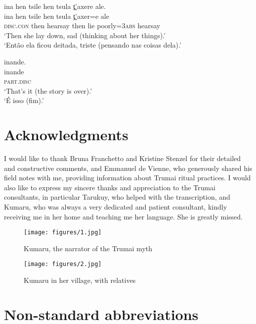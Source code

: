 \documentclass[output=paper,
modfonts,nonflat
]{langsci/langscibook}
\begin{document}
\ea ina hen tsile hen tsula t̪'axere ale.\\[.3em]
\gll ina hen tsile  hen tsula  t̪'axer=e  ale\\
\textsc{disc.con}  then  hearsay  then  lie      poorly=\textsc{3abs}  hearsay\\
\glt `Then she lay down, sad (thinking about her things).'\\
‘Então ela ficou deitada, triste (pensando nas coisas dela).’
\z

\ea inande.\\[.3em]
\gll inande\\
\textsc{part.disc}\\
\glt `That's it (the story is over).'\\
‘É isso (fim).’
\z

\section*{Acknowledgments}
I would like to thank Bruna Franchetto and Kristine Stenzel for their detailed and constructive comments, and Emmanuel de Vienne, who generously shared his field notes with me, providing information about Trumai ritual practices. I would also like to express my sincere thanks and appreciation to the Trumai consultants, in particular Tarukuy, who helped with the transcription, and Kumaru, who was always a very dedicated and patient consultant, kindly receiving me in her home and teaching me her language. She is greatly missed. 



\begin{figure}
  \texttt{[image: figures/1.jpg]}
  \caption{Kumaru, the narrator of the Trumai myth}
\end{figure}
\begin{figure}
  \texttt{[image: figures/2.jpg]}
  \caption{Kumaru in her village, with relatives}
\end{figure}


\section*{Non-standard abbreviations}
\end{document}
